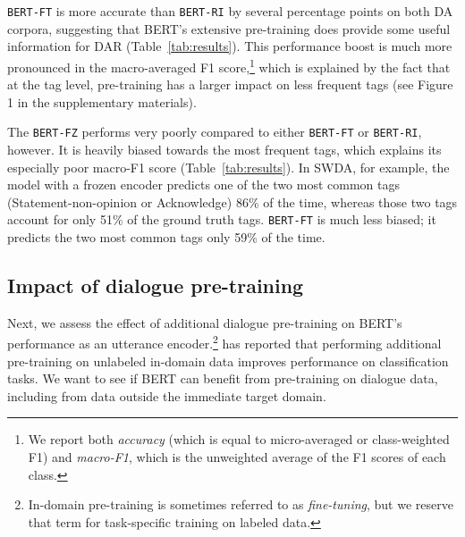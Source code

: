 \documentclass[11pt,a4paper]{article}
\begin{document}
\texttt{BERT-FT} is more accurate than \texttt{BERT-RI} by several percentage points on both DA corpora,
suggesting that BERT's extensive pre-training does provide some useful information for DAR (Table~\ref{tab:results}).
This performance boost is much more pronounced in the macro-averaged F1 score,\footnote{We report both \emph{accuracy} (which is equal to micro-averaged or class-weighted F1) and \emph{macro-F1}, which is the unweighted average of the F1 scores of each class.}
which is explained by the fact that at the tag level, pre-training has a larger impact on less frequent tags
(see Figure 1 in the supplementary materials). 

The \texttt{BERT-FZ} performs very poorly compared to either \texttt{BERT-FT} or \texttt{BERT-RI}, however.
It is heavily biased towards the most frequent tags, which explains its especially poor macro-F1 score (Table~\ref{tab:results}).
In SWDA, for example, the model with a frozen encoder predicts one of the two most common tags (Statement-non-opinion or Acknowledge) 86\% of the time, whereas those two
tags account for only 51\% of the ground truth tags.
\texttt{BERT-FT} is much less biased; it predicts the two most common tags only 59\% of the time.




\subsection{Impact of dialogue pre-training} \label{sec:experiment3} %

Next, we assess the effect of additional dialogue pre-training on BERT's performance as an utterance encoder.\footnote{
In-domain pre-training is sometimes referred to as \textit{fine-tuning}, but we reserve that term for task-specific training on labeled data.}
\citet{sunHowFineTuneBERT2019} has reported that performing additional pre-training on unlabeled in-domain data improves performance on classification tasks. 
We want to see if BERT can benefit from pre-training on dialogue data, including from data outside the immediate target domain.
\end{document}
